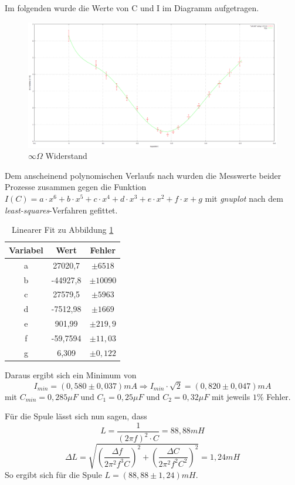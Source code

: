 Im folgenden wurde die Werte von C und I im Diagramm aufgetragen.
\begin{figure}[h]
  \centering
  \includegraphics[width=.9\textwidth]{unendlich.png}
  \caption{$\infty\Omega$ Widerstand}
  \label{fig:unendlich}
\end{figure}

Dem anscheinend polynomischen Verlaufs nach wurden die Messwerte beider Prozesse zusammen gegen die Funktion $I(C)=a\cdot x^6+b\cdot x^5+c\cdot x^4+d\cdot x^3+e\cdot x^2+f\cdot x+g$ mit \emph{gnuplot} nach dem \emph{least-squares}-Verfahren gefittet.
\begin{table}[H]
  \centering
  \begin{tabular}{c | c | c }
    Variabel & Wert & Fehler\\ \hline
    a  & 27020,7 & $\pm 6518$\\
    b & -44927,8 & $\pm10090$\\
    c  & 27579,5 & $\pm 5963$\\
    d  & -7512,98 & $\pm 1669$\\
    e  & 901,99 & $\pm 219,9$\\
    f  & -59,7594 & $\pm 11,03$\\
    g  & 6,309 & $\pm 0,122$\\
  \end{tabular}
  \caption{Linearer Fit zu Abbildung \ref{fig:unendlich}}
  \label{tab:fitinfi}
\end{table}

Daraus ergibt sich ein Minimum von
\begin{equation}
I_{min}=(0,580\pm 0,037)mA \Rightarrow I_{min}\cdot \sqrt{2}=(0,820\pm0,047)mA
\end{equation}
mit $C_{min}=0,285 \mu F$ und $C_{1}=0,25 \mu F$ und $C_{2}=0,32 \mu F$ mit jeweils $1\%$ Fehler.

Für die Spule lässt sich nun sagen, dass
\begin{equation}
L=\frac{1}{(2\pi f)^2\cdot C}=88,88mH
\end{equation}
\begin{equation}
\Delta L =\sqrt{(\frac{\Delta f}{2\pi^2 f^3 C})^2+(\frac{\Delta C}{2\pi^2 f^2 C^2})^2}=1,24mH
\end{equation}
So ergibt sich für die Spule $L=(88,88 \pm 1,24)mH$.

